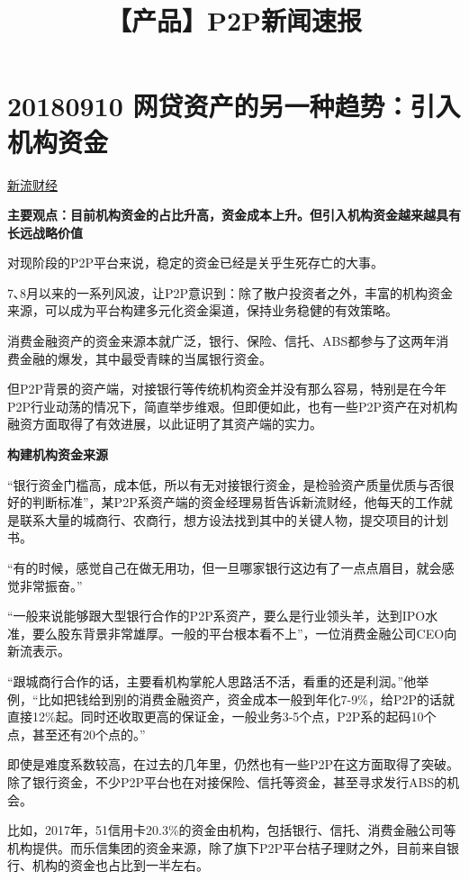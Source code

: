 \documentclass[]{article}
\title{【产品】P2P新闻速报}
\author{}
\date{}
\begin{document}
\maketitle

{
\setcounter{tocdepth}{2}
\tableofcontents
}
\section{20180910 网贷资产的另一种趋势：引入机构资金}

\href{https://mp.weixin.qq.com/s/5SzFISQapWs4ssCEriwiig}{新流财经}

\textbf{主要观点：目前机构资金的占比升高，资金成本上升。但引入机构资金越来越具有长远战略价值}

对现阶段的P2P平台来说，稳定的资金已经是关乎生死存亡的大事。

7､8月以来的一系列风波，让P2P意识到：除了散户投资者之外，丰富的机构资金来源，可以成为平台构建多元化资金渠道，保持业务稳健的有效策略。

消费金融资产的资金来源本就广泛，银行、保险、信托、ABS都参与了这两年消费金融的爆发，其中最受青睐的当属银行资金。

但P2P背景的资产端，对接银行等传统机构资金并没有那么容易，特别是在今年P2P行业动荡的情况下，简直举步维艰。但即便如此，也有一些P2P资产在对机构融资方面取得了有效进展，以此证明了其资产端的实力。

\textbf{构建机构资金来源}

``银行资金门槛高，成本低，所以有无对接银行资金，是检验资产质量优质与否很好的判断标准''，某P2P系资产端的资金经理易哲告诉新流财经，他每天的工作就是联系大量的城商行、农商行，想方设法找到其中的关键人物，提交项目的计划书。

``有的时候，感觉自己在做无用功，但一旦哪家银行这边有了一点点眉目，就会感觉非常振奋。''

``一般来说能够跟大型银行合作的P2P系资产，要么是行业领头羊，达到IPO水准，要么股东背景非常雄厚。一般的平台根本看不上''，一位消费金融公司CEO向新流表示。

``跟城商行合作的话，主要看机构掌舵人思路活不活，看重的还是利润。''他举例，``比如把钱给到别的消费金融资产，资金成本一般到年化7-9\%，给P2P的话就直接12\%起。同时还收取更高的保证金，一般业务3-5个点，P2P系的起码10个点，甚至还有20个点的。''

即使是难度系数较高，在过去的几年里，仍然也有一些P2P在这方面取得了突破。除了银行资金，不少P2P平台也在对接保险、信托等资金，甚至寻求发行ABS的机会。

比如，2017年，51信用卡20.3\%的资金由机构，包括银行、信托、消费金融公司等机构提供。而乐信集团的资金来源，除了旗下P2P平台桔子理财之外，目前来自银行、机构的资金也占比到一半左右。
\end{document}
